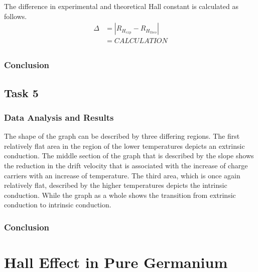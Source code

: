 \documentclass[a4paper]{article}
\begin{document}
The difference in experimental and theoretical Hall constant is calculated as follows.
\begin{align*}
\Delta &= | R_{H_{exp}} - R_{H_{theo}} | \\
	   &= CALCULATION \\
\end{align*}


\subsubsection{Conclusion}

\subsection{Task 5}

\subsubsection{Data Analysis and Results}

\qq The shape of the graph can be described by three differing
regions. The first relatively flat area in the region of the lower
temperatures depicts an extrinsic conduction. The middle section of
the graph that is described by the slope shows the reduction in the
drift velocity that is associated with the increase of charge carriers
with an increase of temperature. The third area, which is once again
relatively flat, described by the higher temperatures depicts the
intrinsic conduction. While the graph as a whole shows the transition
from extrinsic conduction to intrinsic conduction.

\subsubsection{Conclusion}

\newpage

\section{Hall Effect in Pure Germanium}
\end{document}
